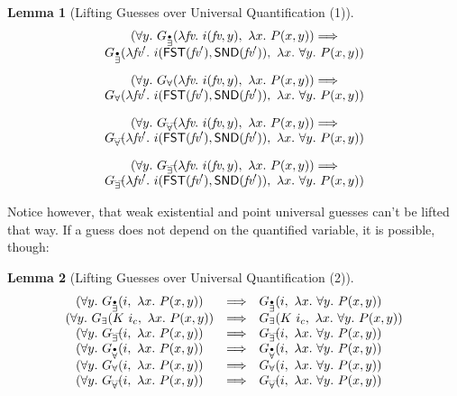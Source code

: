 \documentclass[a4paper,12pt,DIV=12,oneside]{scrbook}
\newcommand{\fv}{\textit{fv}}
\newtheorem{lemma}{Lemma}[section]
\theoremstyle{definition}
\theoremstyle{remark}
\newcommand{\GE}{\ensuremath{G_\exists}}
\newcommand{\GEP}{\ensuremath{G_{\accentset{\bullet}{\exists}}}}
\newcommand{\GEG}{\ensuremath{G_{\accentset{\_\,\_}{\exists}}}}
\newcommand{\GU}{\ensuremath{G_\forall}}
\newcommand{\GUP}{\ensuremath{G_{\accentset{\bullet}{\forall}}}}
\newcommand{\GUG}{\ensuremath{G_{\accentset{\_\,\_}{\forall}}}}
\begin{document}
\begin{lemma}[Lifting Guesses over Universal Quantification (1)]\label{lemma_guesses_lift_forall_1}
\[
\begin{array}{c}
(\forall y.\ \GEP(\lambda \fv.\ i(\fv, y),\ \lambda x.\ P(x, y)) \Longrightarrow \\
\GEP(\lambda \fv'.\ i(\textsf{FST}(\fv'), \textsf{SND}(\fv')),\ \lambda x.\ \forall y.\ P(x, y)) \\[1em]

(\forall y.\ \GU(\lambda \fv.\ i(\fv, y),\ \lambda x.\ P(x, y)) \Longrightarrow \\
\GU(\lambda \fv'.\ i(\textsf{FST}(\fv'), \textsf{SND}(\fv')),\ \lambda x.\ \forall y.\ P(x, y)) \\[1em]

(\forall y.\ \GUG(\lambda \fv.\ i(\fv, y),\ \lambda x.\ P(x, y)) \Longrightarrow \\
\GUG(\lambda \fv'.\ i(\textsf{FST}(\fv'), \textsf{SND}(\fv')),\ \lambda x.\ \forall y.\ P(x, y)) \\[1em]

(\forall y.\ \GEG(\lambda \fv.\ i(\fv, y),\ \lambda x.\ P(x, y)) \Longrightarrow \\
\GEG(\lambda \fv'.\ i(\textsf{FST}(\fv'), \textsf{SND}(\fv')),\ \lambda x.\ \forall y.\ P(x, y)) \\
\end{array}
\]
\end{lemma}
%
Notice however, that weak existential and point universal guesses can't be lifted that way. If a guess does not depend on the quantified variable,
it is possible, though:

\begin{lemma}[Lifting Guesses over Universal Quantification (2)]\label{lemma_guesses_lift_forall_2}
\[
\begin{array}{c@{\quad}c@{\quad}l}
(\forall y.\ \GEP(i,\ \lambda x.\ P(x, y)) & \Longrightarrow & \GEP(i,\ \lambda x.\ \forall y.\ P(x, y)) \\
(\forall y.\ \GE(K\ i_c,\ \lambda x.\ P(x, y)) & \Longrightarrow & \GE(K\ i_c,\ \lambda x.\ \forall y.\ P(x, y)) \\
(\forall y.\ \GEG(i,\ \lambda x.\ P(x, y)) & \Longrightarrow & \GEG(i,\ \lambda x.\ \forall y.\ P(x, y)) \\
(\forall y.\ \GUP(i,\ \lambda x.\ P(x, y)) & \Longrightarrow & \GUP(i,\ \lambda x.\ \forall y.\ P(x, y)) \\
(\forall y.\ \GU(i,\ \lambda x.\ P(x, y)) & \Longrightarrow & \GU(i,\ \lambda x.\ \forall y.\ P(x, y)) \\
(\forall y.\ \GUG(i,\ \lambda x.\ P(x, y)) & \Longrightarrow & \GUG(i,\ \lambda x.\ \forall y.\ P(x, y))
\end{array}
\]
\end{lemma}
\end{document}
